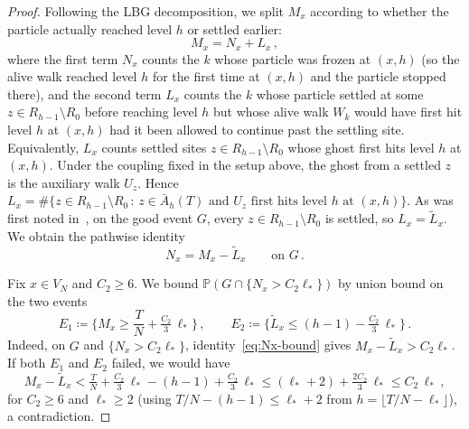 \documentclass[11pt,a4paper,reqno]{amsart}
\theoremstyle{definition}
\newcommand{\bbP}{{\ensuremath{\mathbb P}} }
\begin{document}
\begin{proof}
Following the LBG decomposition, we split $M_x$ according to whether the particle actually reached level $h$ or settled earlier:
	\[ M_x = N_x + L_x\,, \]
where the first term $N_x$ counts the $k$ whose particle was frozen at $(x, h)$ (so the alive walk reached level $h$ for the first time at $(x, h)$ and the particle stopped there), and the second term $L_x$ counts the $k$ whose particle settled at some $z \in R_{h-1}\setminus R_0$ before reaching level $h$ but whose alive walk $W_k$ would have first hit level $h$ at $(x, h)$ had it been allowed to continue past the settling site. Equivalently, $L_x$ counts settled sites $z \in R_{h-1}\setminus R_0$ whose ghost first hits level $h$ at $(x, h)$. Under the coupling fixed in the setup above, the ghost from a settled $z$ is the auxiliary walk $U_z$. Hence $L_x = \#\{z \in R_{h-1}\setminus R_0\,:\, z \in \bar A_h(T) \text{ and } U_z \text{ first hits level } h \text{ at } (x,h)\}$. As was first noted in~\cite{asselah2025internal}, on the good event $G$, every $z \in R_{h-1}\setminus R_0$ is settled, so $L_x = \widetilde L_x$. We obtain the pathwise identity
	\begin{equation}\label{eq:Nx-bound}
	 N_x = M_x - \widetilde L_x \qquad \text{on } G\,.
	\end{equation}

Fix $x \in V_N$ and $C_2 \geq 6$. We bound $\bbP(G \cap \{N_x > C_2 \ell_*\})$ by union bound on the two events
	\[ E_1 \coloneqq \Big\{ M_x \geq \frac{T}{N} + \tfrac{C_2}{3}\,\ell_* \Big\}\,, \qquad
	E_2 \coloneqq \Big\{ \widetilde L_x \leq (h-1) - \tfrac{C_2}{3}\,\ell_* \Big\}\,. \]
Indeed, on $G$ and $\{N_x > C_2 \ell_*\}$, identity~\eqref{eq:Nx-bound} gives $M_x - \widetilde L_x > C_2 \ell_*$. If both $E_1$ and $E_2$ failed, we would have
\[
  M_x - \widetilde L_x < \tfrac{T}{N} + \tfrac{C_2}{3}\,\ell_* - (h-1) + \tfrac{C_2}{3}\,\ell_*
  \leq (\ell_* + 2) + \tfrac{2 C_2}{3}\,\ell_* \leq C_2\, \ell_*\,,
\]
for $C_2 \geq 6$ and $\ell_* \geq 2$ (using $T/N - (h-1) \leq \ell_* + 2$ from $h = \lfloor T/N - \ell_*\rfloor$), a contradiction.


\end{proof}
\end{document}
